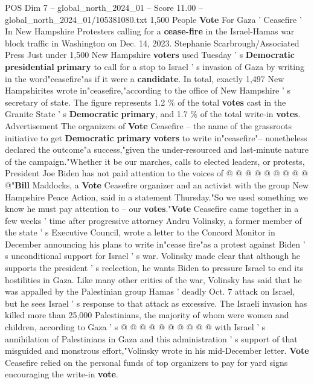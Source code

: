 \begin{textsample}{POS Dim 7 – global\_north\_2024\_01 – Score 11.00 – global\_north\_2024\_01/105381080.txt}  \label{ex:f7_pos_187}
1,500 People \textbf{Vote} For Gaza ' Ceasefire ' In New Hampshire Protesters calling for a \textbf{cease-fire} in the Israel-Hamas war block traffic in Washington on Dec. 14, 2023.
Stephanie Scarbrough/Associated Press Just under 1,500 New Hampshire \textbf{voters} used Tuesday ' s \textbf{Democratic} \textbf{presidential} \textbf{primary} to call for a stop to Israel ' s invasion of Gaza by writing in the word"ceasefire"as if it were a \textbf{candidate}.
In total, exactly 1,497 New Hampshirites wrote in"ceasefire,"according to the office of New Hampshire ' s secretary of state.
The figure represents 1.2 \% of the total \textbf{votes} cast in the Granite State ' s \textbf{Democratic} \textbf{primary}, and 1.7 \% of the total write-in \textbf{votes}.
Advertisement The organizers of \textbf{Vote} Ceasefire -- the name of the grassroots initiative to get \textbf{Democratic} \textbf{primary} \textbf{voters} to write in"ceasefire"-- nonetheless declared the outcome"a success,"given the under-resourced and last-minute nature of the campaign."Whether it be our marches, calls to elected leaders, or protests, President Joe Biden has not paid attention to the voices of @ @ @ @ @ @ @ @ @ @"\textbf{Bill} Maddocks, a \textbf{Vote} Ceasefire organizer and an activist with the group New Hampshire Peace Action, said in a statement Thursday."So we used something we know he must pay attention to -- our \textbf{votes}."\textbf{Vote} Ceasefire came together in a few weeks ' time after progressive attorney Andru Volinsky, a former member of the state ' s Executive Council, wrote a letter to the Concord Monitor in December announcing his plans to write in"cease fire"as a protest against Biden ' s unconditional support for Israel ' s war.
Volinsky made clear that although he supports the president ' s reelection, he wants Biden to pressure Israel to end its hostilities in Gaza.
Like many other critics of the war, Volinsky has said that he was appalled by the Palestinian group Hamas ' deadly Oct. 7 attack on Israel, but he sees Israel ' s response to that attack as excessive.
The Israeli invasion has killed more than 25,000 Palestinians, the majority of whom were women and children, according to Gaza ' s @ @ @ @ @ @ @ @ @ @ with Israel ' s annihilation of Palestinians in Gaza and this administration ' s support of that misguided and monstrous effort,"Volinsky wrote in his mid-December letter. \textbf{Vote} Ceasefire relied on the personal funds of top organizers to pay for yard signs encouraging the write-in \textbf{vote}.

\end{textsample}
